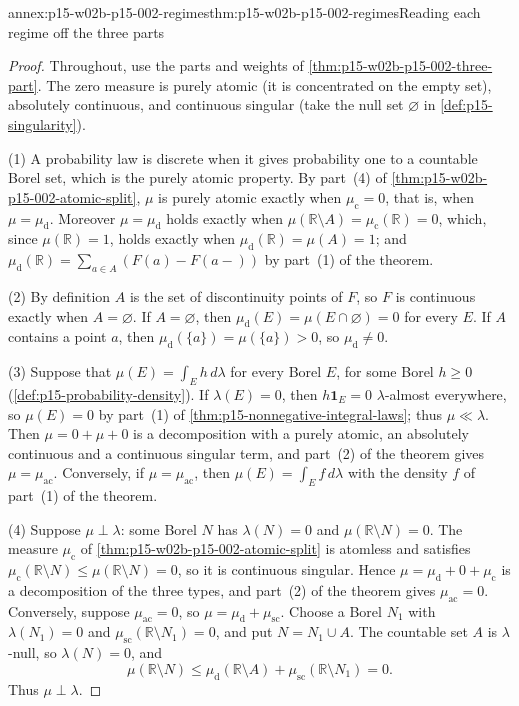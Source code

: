 \begin{annexitem}{annex:p15-w02b-p15-002-regimes}{thm:p15-w02b-p15-002-regimes}{Reading each regime off the three parts}
\begin{proof}
Throughout, use the parts and weights of
\cref{thm:p15-w02b-p15-002-three-part}. The zero measure is purely
atomic (it is concentrated on the empty set), absolutely continuous, and
continuous singular (take the null set \(\varnothing\) in
\cref{def:p15-singularity}).

(1) A probability law is discrete when it gives probability one to a
countable Borel set, which is the purely atomic property. By part~(4) of
\cref{thm:p15-w02b-p15-002-atomic-split}, \(\mu\) is purely atomic
exactly when \(\mu_{\mathrm c}=0\), that is, when
\(\mu=\mu_{\mathrm d}\). Moreover \(\mu=\mu_{\mathrm d}\) holds exactly
when \(\mu(\mathbb R\setminus A)=\mu_{\mathrm c}(\mathbb R)=0\), which,
since \(\mu(\mathbb R)=1\), holds exactly when
\(\mu_{\mathrm d}(\mathbb R)=\mu(A)=1\); and
\(\mu_{\mathrm d}(\mathbb R)=\sum_{a\in A}(F(a)-F(a-))\) by part~(1) of
the theorem.

(2) By definition \(A\) is the set of discontinuity points of \(F\), so
\(F\) is continuous exactly when \(A=\varnothing\). If
\(A=\varnothing\), then \(\mu_{\mathrm d}(E)=\mu(E\cap\varnothing)=0\)
for every \(E\). If \(A\) contains a point \(a\), then
\(\mu_{\mathrm d}(\{a\})=\mu(\{a\})>0\), so \(\mu_{\mathrm d}\neq0\).

(3) Suppose that \(\mu(E)=\int_Eh\,d\lambda\) for every Borel \(E\), for
some Borel \(h\geq0\) (\cref{def:p15-probability-density}). If
\(\lambda(E)=0\), then \(h\mathbf1_E=0\) \(\lambda\)-almost everywhere,
so \(\mu(E)=0\) by part~(1) of \cref{thm:p15-nonnegative-integral-laws};
thus \(\mu\ll\lambda\). Then \(\mu=0+\mu+0\) is a decomposition with a
purely atomic, an absolutely continuous and a continuous singular term,
and part~(2) of the theorem gives \(\mu=\mu_{\mathrm{ac}}\). Conversely,
if \(\mu=\mu_{\mathrm{ac}}\), then \(\mu(E)=\int_Ef\,d\lambda\) with the
density \(f\) of part~(1) of the theorem.

(4) Suppose \(\mu\perp\lambda\): some Borel \(N\) has \(\lambda(N)=0\)
and \(\mu(\mathbb R\setminus N)=0\). The measure \(\mu_{\mathrm c}\) of
\cref{thm:p15-w02b-p15-002-atomic-split} is atomless and satisfies
\(\mu_{\mathrm c}(\mathbb R\setminus N)\leq\mu(\mathbb R\setminus N)=0\),
so it is continuous singular. Hence
\(\mu=\mu_{\mathrm d}+0+\mu_{\mathrm c}\) is a decomposition of the
three types, and part~(2) of the theorem gives \(\mu_{\mathrm{ac}}=0\).
Conversely, suppose \(\mu_{\mathrm{ac}}=0\), so
\(\mu=\mu_{\mathrm d}+\mu_{\mathrm{sc}}\). Choose a Borel \(N_1\) with
\(\lambda(N_1)=0\) and \(\mu_{\mathrm{sc}}(\mathbb R\setminus N_1)=0\),
and put \(N=N_1\cup A\). The countable set \(A\) is \(\lambda\)-null, so
\(\lambda(N)=0\), and
\[
 \mu(\mathbb R\setminus N)
   \leq\mu_{\mathrm d}(\mathbb R\setminus A)
       +\mu_{\mathrm{sc}}(\mathbb R\setminus N_1)=0 .
\]
Thus \(\mu\perp\lambda\).


\end{proof}
\end{annexitem}
